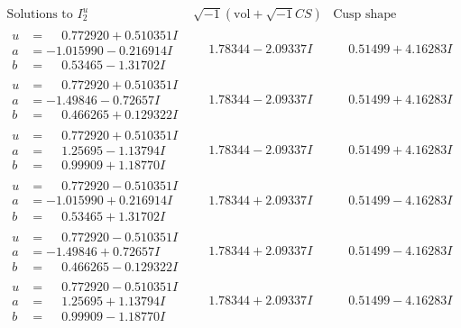 \documentclass[1p]{elsarticle_modified}
\theoremstyle{definition}
\newcommand{\I}{\sqrt{-1}}
\begin{document}
$$\begin{array}{c|c|c}  
\text{Solutions to }I^u_{2}& \I (\text{vol} + \sqrt{-1}CS) & \text{Cusp shape}\\
 \hline 
\begin{aligned}
u &= \phantom{-}0.772920 + 0.510351 I \\
a &= -1.015990 - 0.216914 I \\
b &= \phantom{-}0.53465 - 1.31702 I\end{aligned}
 & \phantom{-}1.78344 - 2.09337 I & \phantom{-}0.51499 + 4.16283 I \\ \hline\begin{aligned}
u &= \phantom{-}0.772920 + 0.510351 I \\
a &= -1.49846 - 0.72657 I \\
b &= \phantom{-}0.466265 + 0.129322 I\end{aligned}
 & \phantom{-}1.78344 - 2.09337 I & \phantom{-}0.51499 + 4.16283 I \\ \hline\begin{aligned}
u &= \phantom{-}0.772920 + 0.510351 I \\
a &= \phantom{-}1.25695 - 1.13794 I \\
b &= \phantom{-}0.99909 + 1.18770 I\end{aligned}
 & \phantom{-}1.78344 - 2.09337 I & \phantom{-}0.51499 + 4.16283 I \\ \hline\begin{aligned}
u &= \phantom{-}0.772920 - 0.510351 I \\
a &= -1.015990 + 0.216914 I \\
b &= \phantom{-}0.53465 + 1.31702 I\end{aligned}
 & \phantom{-}1.78344 + 2.09337 I & \phantom{-}0.51499 - 4.16283 I \\ \hline\begin{aligned}
u &= \phantom{-}0.772920 - 0.510351 I \\
a &= -1.49846 + 0.72657 I \\
b &= \phantom{-}0.466265 - 0.129322 I\end{aligned}
 & \phantom{-}1.78344 + 2.09337 I & \phantom{-}0.51499 - 4.16283 I \\ \hline\begin{aligned}
u &= \phantom{-}0.772920 - 0.510351 I \\
a &= \phantom{-}1.25695 + 1.13794 I \\
b &= \phantom{-}0.99909 - 1.18770 I\end{aligned}
 & \phantom{-}1.78344 + 2.09337 I & \phantom{-}0.51499 - 4.16283 I \\ \hline\begin{aligned}

\end{aligned}
\end{array}$$
\end{document}
